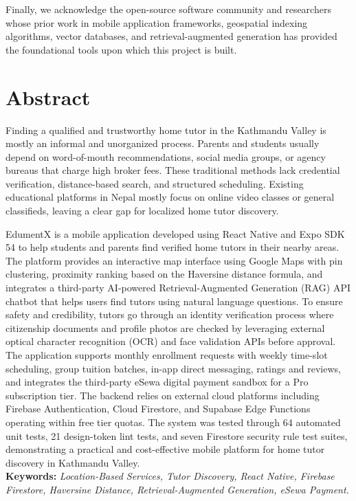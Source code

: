 \documentclass[12pt]{report}
\begin{document}
Finally, we acknowledge the open-source software community and researchers whose prior work in mobile application frameworks, geospatial indexing algorithms, vector databases, and retrieval-augmented generation has provided the foundational tools upon which this project is built.

\newpage
\chapter*{Abstract}
Finding a qualified and trustworthy home tutor in the Kathmandu Valley is mostly an informal and unorganized process. Parents and students usually depend on word-of-mouth recommendations, social media groups, or agency bureaus that charge high broker fees. These traditional methods lack credential verification, distance-based search, and structured scheduling. Existing educational platforms in Nepal mostly focus on online video classes or general classifieds, leaving a clear gap for localized home tutor discovery.

EdumentX is a mobile application developed using React Native and Expo SDK 54 to help students and parents find verified home tutors in their nearby areas. The platform provides an interactive map interface using Google Maps with pin clustering, proximity ranking based on the Haversine distance formula, and integrates a third-party AI-powered Retrieval-Augmented Generation (RAG) API chatbot that helps users find tutors using natural language questions. To ensure safety and credibility, tutors go through an identity verification process where citizenship documents and profile photos are checked by leveraging external optical character recognition (OCR) and face validation APIs before approval. The application supports monthly enrollment requests with weekly time-slot scheduling, group tuition batches, in-app direct messaging, ratings and reviews, and integrates the third-party eSewa digital payment sandbox for a Pro subscription tier. The backend relies on external cloud platforms including Firebase Authentication, Cloud Firestore, and Supabase Edge Functions operating within free tier quotas. The system was tested through 64 automated unit tests, 21 design-token lint tests, and seven Firestore security rule test suites, demonstrating a practical and cost-effective mobile platform for home tutor discovery in Kathmandu Valley.\\

\noindent\textbf{Keywords:} \textit{Location-Based Services, Tutor Discovery, React Native, Firebase Firestore, Haversine Distance, Retrieval-Augmented Generation, eSewa Payment.}
\end{document}

